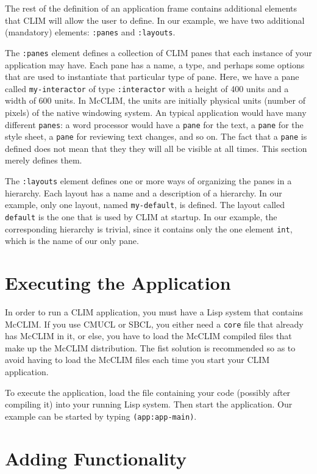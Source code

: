 The rest of the definition of an application frame contains additional
elements that CLIM will allow the user to define.  In our example, we
have two additional (mandatory) elements: \texttt{:panes} and
\texttt{:layouts}. 

The \texttt{:panes} element defines a collection of CLIM panes that
each instance of your application may have.  Each pane has a name, a
type, and perhaps some options that are used to instantiate that
particular type of pane.  Here, we have a pane called
\texttt{my-interactor} of type \texttt{:interactor} with a height of
400 units and a width of 600 units.  In McCLIM, the units are
initially physical units (number of pixels) of the native windowing
system. An typical application would have many different
\texttt{panes}: a word processor would have a \texttt{pane} for the
text, a \texttt{pane} for the style sheet, a \texttt{pane} for
reviewing text changes, and so on. The fact that a \texttt{pane} is
defined does not mean that they they will all be visible at all
times. This section merely defines them.

The \texttt{:layouts} element defines one or more ways of organizing
the panes in a hierarchy.  Each layout has a name and a description of
a hierarchy.  In our example, only one layout, named
\texttt{my-default}, is defined.  The layout called \texttt{default}
is the one that is used by CLIM at startup.  In our example, the
corresponding hierarchy is trivial, since it contains only the one
element \texttt{int}, which is the name of our only pane. 

\section{Executing the Application}

In order to run a CLIM application, you must have a Lisp system that
contains McCLIM.  If you use CMUCL or SBCL, you either need a
\texttt{core} file that already has McCLIM in it, or else, you have to
load the McCLIM compiled files that make up the McCLIM distribution.
The fist solution is recommended so as to avoid having to load the
McCLIM files each time you start your CLIM application.

To execute the application, load the file containing your code
(possibly after compiling it) into your running Lisp system.  Then
start the application.  Our example can be started by typing
\texttt{(app:app-main)}.

\section{Adding Functionality}


